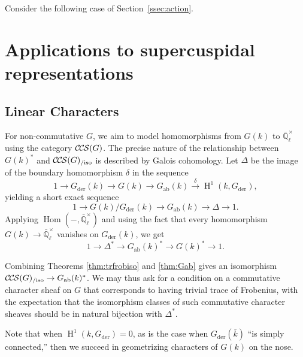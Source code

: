 \documentclass[10pt]{amsart}
\theoremstyle{plain}
\newtheorem{corollary}[theorem]{Corollary}
\theoremstyle{definition}
\newcommand{\EE}{\mathbb{\bar Q}_\ell}
\newcommand{\bFq}{\bar{k}}
\newcommand{\Fq}{k}
\newcommand{\EEx}{\EE^\times}
\DeclareMathOperator{\Hom}{Hom}
\DeclareMathOperator{\Hh}{H}
\newcommand{\der}{_{\operatorname{der}}}
\newcommand{\ab}{_{\operatorname{ab}}}
\newcommand{\iso}{{\ \cong\ }}
\newcommand{\CCS}{{\mathcal{C\hskip-.8pt C\hskip-0.8pt S}}}
\newcommand{\CCSiso}[1]{\CCS(#1)_{/\text{iso}}}
\begin{document}
Consider the following case of Section~\ref{ssec:action}.

\fi

\section{Applications to supercuspidal representations}

\subsection{Linear Characters}

For non-commutative $G$, we aim to model homomorphisms from $G(k)$ to $\EEx$ using the category $\CCS(G)$.
The precise nature of the relationship between $G(k)^*$ and $\CCSiso{G}$ is described by Galois cohomology.
Let $\Delta$ be the image of the boundary homomorphism $\delta$ in the sequence
\[
1 \to G\der(k) \to G(k) \to G\ab(k) \xrightarrow{\delta} \Hh^1(k, G\der),
\]
yielding a short exact sequence
\[
1 \to G(k) / G\der(k) \to G\ab(k) \to \Delta \to 1.
\]
Applying $\Hom(-, \EEx)$ and using the fact that every homomorphism $G(k) \to \EEx$ vanishes on $G\der(k)$, we get
\[
1 \to \Delta^* \to G\ab(k)^* \to G(k)^* \to 1.
\]

Combining Theorems \ref{thm:trfrobiso} and \ref{thm:Gab} gives an isomorphism $\CCSiso{G} \to G\ab(k)^*$.
We may thus ask for a condition on a commutative character sheaf on $G$ that corresponds to having trivial
trace of Frobenius, with the expectation that the isomorphism classes of such commutative character sheaves
should be in natural bijection with $\Delta^*$.

Note that when $\Hh^1(k,G\der) = 0$, as is the case when $G\der(\bFq)$ ``is simply connected,'' then
we succeed in geometrizing characters of $G(k)$ on the nose.

% 
\end{document}
